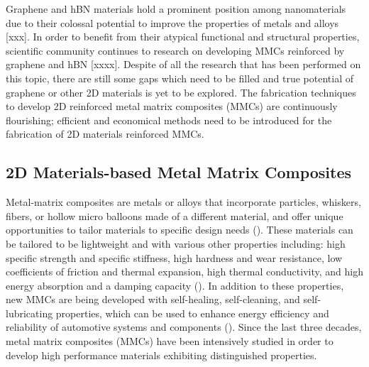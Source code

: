 Graphene and hBN materials hold a prominent position among nanomaterials due to their colossal potential to improve the properties of metals and alloys [xxx]. In order to benefit from their atypical functional and structural properties, scientific community continues to research on developing MMCs reinforced by graphene and hBN [xxxx]. Despite of all the research that has been performed on this topic, there are still some gaps which need to be filled and true potential of graphene or other 2D materials is yet to be explored. The fabrication techniques to develop 2D reinforced metal matrix composites (MMCs) are continuously flourishing; efficient and economical methods need to be introduced for the fabrication of 2D materials reinforced MMCs.



\subsection{2D Materials-based Metal Matrix Composites}


Metal-matrix composites are metals or alloys that incorporate particles, whiskers, fibers, or hollow micro balloons made of a different material, and offer unique opportunities to tailor materials to specific design needs (\cite{mortensen2010metal, sidhu2016metal, miracle2005metal}). These materials can be tailored to be lightweight and with various other properties including: high specific strength and specific stiffness, high hardness and wear resistance, low coefficients of friction and thermal expansion, high thermal conductivity, and high energy absorption and a damping capacity (\cite{miracle2005metal}). In addition to these properties, new MMCs are being developed with self-healing, self-cleaning, and self-lubricating properties, which can be used to enhance energy efficiency and reliability of automotive systems and components (\cite {macke2012metal}). Since the last three decades, metal matrix composites (MMCs) have been intensively studied in order to develop high performance materials exhibiting distinguished properties.

